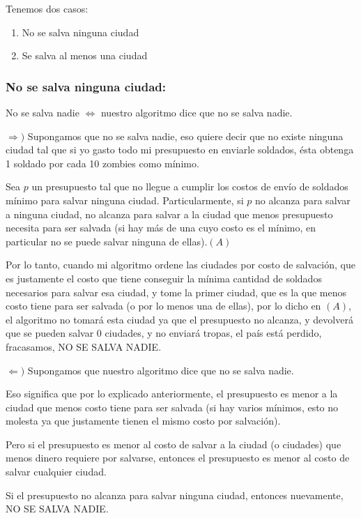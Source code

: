Tenemos dos casos:
\begin{enumerate}
	\item No se salva ninguna ciudad
	\item Se salva al menos una ciudad
\end{enumerate}

\subsubsection{No se salva ninguna ciudad:}

No se salva nadie $\Longleftrightarrow$ nuestro algoritmo dice que no se salva nadie.

$\Longrightarrow )$ Supongamos que no se salva nadie, eso quiere decir que no existe ninguna ciudad tal que si yo gasto todo mi presupuesto en enviarle soldados, ésta obtenga 1 soldado por cada 10 zombies como mínimo.

Sea $p$ un presupuesto tal que no llegue a cumplir los costos de envío de soldados mínimo para salvar ninguna ciudad.
Particularmente, si $p$ no alcanza para salvar a ninguna ciudad, no alcanza para salvar a la ciudad que menos presupuesto necesita para ser salvada (si hay más de una cuyo costo es el mínimo, en particular no se puede salvar ninguna de ellas).$(A)$

Por lo tanto, cuando mi algoritmo ordene las ciudades por costo de salvación, que es justamente el costo que tiene conseguir la mínima cantidad de soldados necesarios para salvar esa ciudad, y tome la primer ciudad, que es la que menos costo tiene para ser salvada (o por lo menos una de ellas), por lo dicho en $(A)$, el algoritmo no tomará esta ciudad ya que el presupuesto no alcanza, y devolverá que se pueden salvar 0 ciudades, y no enviará tropas, el país está perdido, fracasamos, NO SE SALVA NADIE.

$\Longleftarrow )$ Supongamos que nuestro algoritmo dice que no se salva nadie.

Eso significa que por lo explicado anteriormente, el presupuesto es menor a la ciudad que menos costo tiene para ser salvada (si hay varios mínimos, esto no molesta ya que justamente tienen el mismo costo por salvación).

Pero si el presupuesto es menor al costo de salvar a la ciudad (o ciudades) que menos dinero requiere por salvarse, entonces el presupuesto es menor al costo de salvar cualquier ciudad.

Si el presupuesto no alcanza para salvar ninguna ciudad, entonces nuevamente, NO SE SALVA NADIE.

